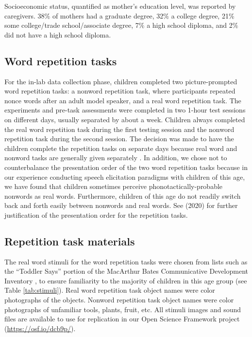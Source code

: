 \documentclass[a4paper,man,natbib,donotrepeattitle, apacite]{apa6}
\begin{document}
Socioeconomic status, quantified as mother’s education level, was reported by caregivers. 38\% of mothers had a graduate degree, 32\% a college degree, 21\% some college/trade school/associate degree, 7\% a high school diploma, and 2\% did not have a high school diploma. 

\subsection{Word repetition tasks}

For the in-lab data collection phase, children completed two picture-prompted word repetition tasks: a nonword repetition task, where participants repeated nonce words after an adult model speaker, and a real word repetition task. The experiments and pre-task assessments were completed in two 1-hour test sessions on different days, usually separated by about a week. Children always completed the real word repetition task during the first testing session and the nonword repetition task during the second session. The decision was made to have the children complete the repetition tasks on separate days because real word and nonword tasks are generally given separately \cite{chiatPreschoolRepetitionTest2007}. In addition, we chose not to counterbalance the presentation order of the two word repetition tasks because in our experience conducting speech elicitation paradigms with children of this age, we have found that children sometimes perceive phonotactically-probable nonwords as real words. Furthermore, children of this age do not readily switch back and forth easily between nonwords and real words. See \citeauthor{cychoszLexicalAdvantageFouryearold2020}(2020) for further justification of the presentation order for the repetition tasks.                                          
\subsection{Repetition task materials}

The real word stimuli for the word repetition tasks were chosen from lists such as the ``Toddler Says'' portion of the MacArthur Bates Communicative Development Inventory \cite{fensonMacArthurBatesCommunicativeDevelopment2007}, to ensure familiarity to the majority of children in this age group (see Table \ref{tab:stimuli}). Real word repetition task object names were color photographs of the objects. Nonword repetition task object names were color photographs of unfamiliar tools, plants, fruit, etc. All stimuli images and sound files are available to use for replication in our Open Science Framework project (\url{https://osf.io/dcb9p/}). 
\end{document}
